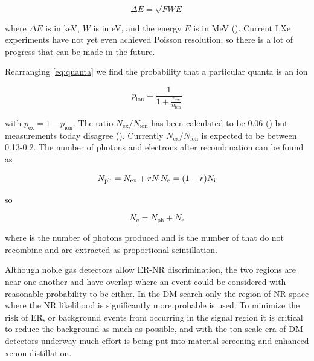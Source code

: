 \begin{equation}
\Delta E = \sqrt{F W E}
\end{equation}

\noindent where $\Delta E$ is in keV, $W$ is in eV, and the energy $E$ is in MeV ().  Current LXe experiments have
not yet even achieved Poisson resolution, so there is a lot of progress that can be made in the future.

Rearranging \eqref{eq:quanta} we find the probability that a particular quanta is an ion

\begin{equation}
p_{\mathrm{ion}} = \frac{1}{1 + \frac{ n_{\mathrm{ex}} }{ n_{\mathrm{ion}} }}
\end{equation}

\noindent with $p_{\mathrm{ex}} = 1 - p_{\mathrm{ion}}$.  The ratio $N_{\mathrm{ex}} / N_{\mathrm{ion}}$ has been calculated to be
0.06 ()
but measurements today disagree ().  Currently $N_{\mathrm{ex}} / N_{\mathrm{ion}}$ is expected to be
between 0.13-0.2.  The number of photons and electrons after recombination can be found as

\begin{equation}
N_{\mathrm{ph}} = N_{\mathrm{ex}} + rN_{\mathrm{i}} \\
N_{\mathrm{e}} = (1 - r)N_{\mathrm{i}} \\
\end{equation}

so

\begin{equation}
N_{q} = N_{\mathrm{ph}} + N_{\mathrm{e}}
\label{eq:nphot_ne}
\end{equation}

\noindent where \nphot is the number of photons produced and \nelect is the number of \electron that do not recombine and are extracted as
proportional scintillation.

Although noble gas detectors allow ER-NR discrimination, the two regions are near one another and have overlap where an event could
be considered with reasonable probability to be either.  In the DM search only the region of NR-space where the NR likelihood is
significantly more probable is used.  To minimize the risk of ER, or background events from occurring in the signal region it is
critical to reduce the background as much as possible, and with the ton-scale era of DM detectors underway much effort is being put into
material screening and enhanced xenon distillation.


